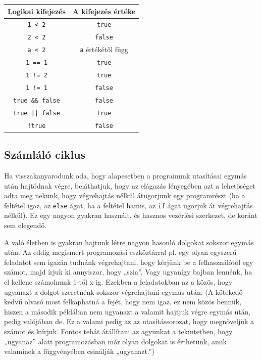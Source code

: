 \documentclass[a4paper]{article}
\begin{document}
\begin{center}
	\begin{tabular}{||c | c||} 
		\hline
		Logikai kifejezés & A kifejezés értéke \\ %
		\hline\hline
		\lstinline[]$1 < 2$ & \lstinline[]$true$ \\
		\hline
		\lstinline[]$2 < 2$ & \lstinline[]$false$ \\
		\hline
		\lstinline[]$a < 2$ & \lstinline[]$a$ értékétől függ \\
		\hline
		\lstinline[]$1 == 1$ & \lstinline[]$true$ \\
		\hline
		\lstinline[]$1 != 2$ & \lstinline[]$true$ \\
		\hline
		\lstinline[]$1 != 1$ & \lstinline[]$false$ \\
		\hline
		\lstinline[]$true && false$ & \lstinline[]$false$ \\
		\hline
		\lstinline[]$true || false$ & \lstinline[]$true$ \\
		\hline
		\lstinline[]$!true$ & \lstinline[]$false$ \\
		\hline
	\end{tabular}
\end{center}

\subsection{Számláló ciklus}
Ha visszakanyarodunk oda, hogy alapesetben a programunk utasításai egymás után hajtódnak végre, beláthatjuk, hogy az elágazás lényegében azt a lehetőséget adta meg nekünk, hogy végrehajtás nélkül átugorjunk egy programrészt (ha a feltétel igaz, az \lstinline{else} ágat, ha a feltétel hamis, az \lstinline{if} ágat ugorjuk át végrehajtás nélkül). Ez egy nagyon gyakran használt, és hasznos vezérlési szerkezet, de koránt sem elegendő.

A való életben is gyakran hajtunk létre nagyon hasonló dolgokat sokszor egymás után. Az eddig megismert programozási eszköztárral pl. egy olyan egyszerű feladatot sem igazán tudnánk végrehajtani, hogy kérjünk be a felhasználótól egy számot, majd írjuk ki annyiszor, hogy „szia”. Vagy ugyanígy bajban lennénk, ha el kellene számolnunk 1-től x-ig. Ezekben a feladatokban az a közös, hogy ugyanazt a dolgot szeretnénk sokszor végrehajtani egymás után. (A kötekedő kedvű olvasó most felkaphatná a fejét, hogy nem igaz, ez nem közös bennük, hiszen a második példában nem ugyanazt a valamit hajtjuk végre egymás után, pedig valójában de. Ez a valami pedig az az utasítássorozat, hogy megnöveljük a számot és kiírjuk. Fontos tehát átállítani az agyunkat a tekintetben, hogy „ugyanaz” alatt programozásban már olyan dolgokat is érthetünk, amik valaminek a függvényében csinálják „ugyanazt.”)
\end{document}
